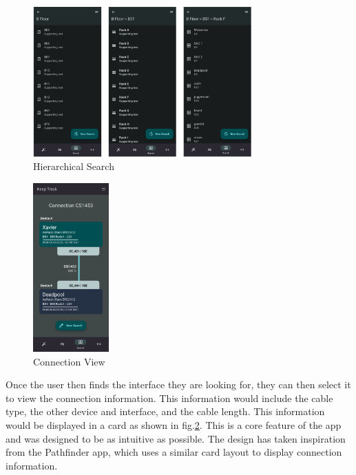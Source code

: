 \documentclass [11pt,a4paper]{article}
\begin{document}
\begin{figure}[H]
    \centering
    \includegraphics[width=0.75\textwidth]{images/heirarchy_search.png}
    \caption{Hierarchical Search}
    \label{fig:hierarchical_search}
\end{figure}
\begin{figure}
    \centering
    \includegraphics[width=0.26\textwidth]{images/connection_display.png}
    \caption{Connection View}
    \label{fig:connection_card}
\end{figure}

Once the user then finds the interface they are looking for, they can then select it to view the connection information. This information would include the cable type, the other device and interface, and the cable length. This information would be displayed in a card as shown in fig.\ref{fig:connection_card}. This is a core feature of the app and was designed to be as intuitive as possible. The design has taken inspiration from the Pathfinder app, which uses a similar card layout to display connection information.
\end{document}
